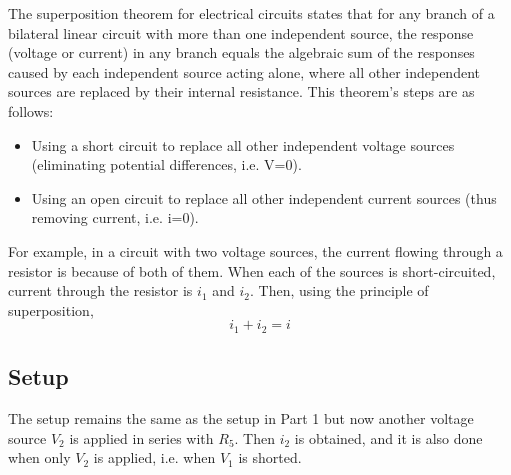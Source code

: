\documentclass{article}
\begin{document}
The superposition theorem for electrical circuits states that for any branch of a bilateral linear circuit with more than one independent source, the response (voltage or current) in any branch equals the algebraic sum of the responses caused by each independent source acting alone, where all other independent sources are replaced by their internal resistance. This theorem's steps are as follows:
\begin{itemize}
\item Using a short circuit to replace all other independent voltage sources (eliminating potential differences, i.e. V=0).
\item Using an open circuit to replace all other independent current sources (thus removing current, i.e. i=0).
\end{itemize}
\begin{center}
\end{center}

For example, in a circuit with two voltage sources, the current flowing through a resistor is because of both of them. When each of the sources is short-circuited, current through the resistor is $i_1$ and $i_2$. Then, using the principle of superposition,
\[ i_1 + i_2 = i \]

\newpage

\subsection{Setup}
The setup remains the same as the setup in Part 1 but now another voltage source $V_2$ is applied in series with $R_5$. Then $i_2$ is obtained, and it is also done when only $V_2$ is applied, i.e. when $V_1$ is shorted.
\end{document}
